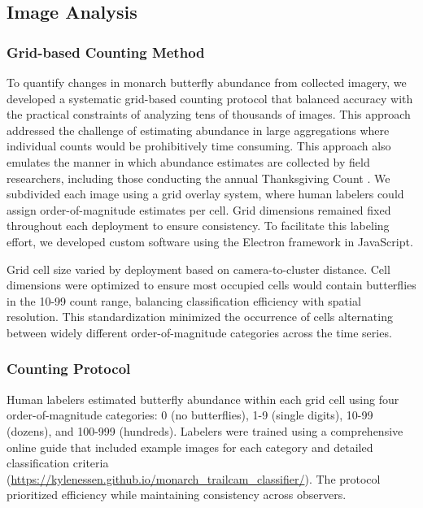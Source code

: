 
\subsection{Image Analysis}

\subsubsection{Grid-based Counting Method}

To quantify changes in monarch butterfly abundance from collected imagery, we developed a systematic grid-based counting protocol that balanced accuracy with the practical constraints of analyzing tens of thousands of images. This approach addressed the challenge of estimating abundance in large aggregations where individual counts would be prohibitively time consuming. This approach also emulates the manner in which abundance estimates are collected by field researchers, including those conducting the annual Thanksgiving Count \autocite{xercesProtocolsWesternMonarch2017}. We subdivided each image using a grid overlay system, where human labelers could assign order-of-magnitude estimates per cell. Grid dimensions remained fixed throughout each deployment to ensure consistency. To facilitate this labeling effort, we developed custom software using the Electron framework in JavaScript.

Grid cell size varied by deployment based on camera-to-cluster distance. Cell dimensions were optimized to ensure most occupied cells would contain butterflies in the 10-99 count range, balancing classification efficiency with spatial resolution. This standardization minimized the occurrence of cells alternating between widely different order-of-magnitude categories across the time series.

\subsubsection{Counting Protocol}

Human labelers estimated butterfly abundance within each grid cell using four order-of-magnitude categories: 0 (no butterflies), 1-9 (single digits), 10-99 (dozens), and 100-999 (hundreds). Labelers were trained using a comprehensive online guide that included example images for each category and detailed classification criteria (\url{https://kylenessen.github.io/monarch_trailcam_classifier/}). The protocol prioritized efficiency while maintaining consistency across observers.

